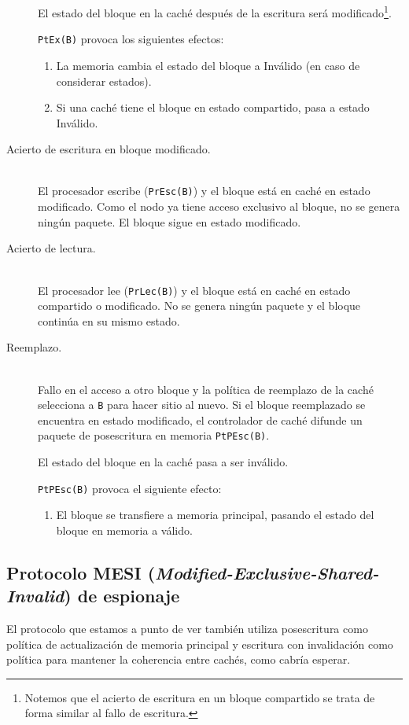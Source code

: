 \begin{description}
    El estado del bloque en la caché después de la escritura será modificado\footnote{Notemos que el acierto de escritura en un bloque compartido se trata de forma similar al fallo de escritura.}.

    \verb|PtEx(B)| provoca los siguientes efectos:
    \begin{enumerate}
        \item La memoria cambia el estado del bloque a Inválido (en caso de considerar estados).
        \item Si una caché tiene el bloque en estado compartido, pasa a estado Inválido.
    \end{enumerate}
    \item [Acierto de escritura en bloque modificado.]~\\
        El procesador escribe (\verb|PrEsc(B)|) y el bloque está en caché en estado modificado. Como el nodo ya tiene acceso exclusivo al bloque, no se genera ningún paquete. El bloque sigue en estado modificado.
    \item [Acierto de lectura.]~\\
        El procesador lee (\verb|PrLec(B)|) y el bloque está en caché en estado compartido o modificado. No se genera ningún paquete y el bloque continúa en su mismo estado.
    \item [Reemplazo.]~\\
        Fallo en el acceso a otro bloque y la política de reemplazo de la caché selecciona a \verb|B| para hacer sitio al nuevo. Si el bloque reemplazado se encuentra en estado modificado, el controlador de caché difunde un paquete de posescritura en memoria \verb|PtPEsc(B)|. 

        El estado del bloque en la caché pasa a ser inválido.

        \verb|PtPEsc(B)| provoca el siguiente efecto:
        \begin{enumerate}
            \item El bloque se transfiere a memoria principal, pasando el estado del bloque en memoria a válido.
        \end{enumerate}
\end{description}

\subsection{Protocolo MESI (\emph{Modified-Exclusive-Shared-Invalid}) de espionaje}
El protocolo que estamos a punto de ver también utiliza posescritura como política de actualización de memoria principal y escritura con invalidación como política para mantener la coherencia entre cachés, como cabría esperar.

